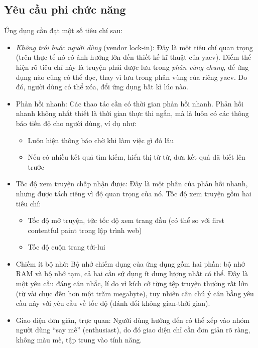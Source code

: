 \documentclass[../../thesis]{subfiles}
\begin{document}
\subsection{Yêu cầu phi chức năng}\label{sec:non-functional-requirements}

Ứng dụng cần đạt một số tiêu chí sau:

\begin{itemize}
    \item \emph{Không trói buộc người dùng} (vendor lock-in): Đây là một tiêu
        chí quan trọng (trên thực tế nó có ảnh hưởng lớn đến thiết kế kĩ thuật
        của yacv). Điểm thể hiện rõ tiêu chí này là truyện phải được lưu trong
        \emph{phân vùng chung}, để ứng dụng nào cũng có thể đọc, thay vì lưu
        trong phân vùng của riêng yacv. Do đó, người dùng có thể xóa, đổi ứng
        dụng bất kì lúc nào.
    \item
        Phản hồi nhanh: Các thao tác cần có thời gian phản hồi nhanh. Phản hồi
        nhanh không nhất thiết là thời gian thực thi ngắn, mà là luôn có các
        thông báo tiến độ cho người dùng, ví dụ như:

        \begin{itemize}
            \item
                Luôn hiện thông báo chờ khi làm việc gì đó lâu
            \item
                Nếu có nhiều kết quả tìm kiếm, hiển thị từ từ, đưa kết quả đã
                biết lên trước
        \end{itemize}
    \item
        Tốc độ xem truyện chấp nhận được: Đây là một phần của phản hồi nhanh,
        nhưng được tách riêng vì độ quan trọng của nó. Tốc độ xem truyện gồm hai
        tiêu chí:

        \begin{itemize}
            \item
                Tốc độ mở truyện, tức tốc độ xem trang đầu (có thể so với first
                contentful paint trong lập trình web)
            \item
                Tốc độ cuộn trang tới-lui
        \end{itemize}
    \item
        Chiếm ít bộ nhớ: Bộ nhớ chiếm dụng của ứng dụng gồm hai phần: bộ nhớ RAM
        và bộ nhớ tạm, cả hai cần sử dụng ít dung lượng nhất có thể. Đây là một
        yêu cầu đáng cân nhắc, lí do vì kích cỡ từng tệp truyện thường rất lớn
        (từ vài chục đến hơn một trăm megabyte), tuy nhiên cần chú ý cân bằng
        yêu cầu này với yêu cầu về tốc độ (đánh đổi không gian-thời gian).
    \item
        Giao diện đơn giản, trực quan: Người dùng hướng đến có thể xếp vào nhóm
        người dùng ``say mê'' (enthusiast), do đó giao diện chỉ cần đơn giản rõ
        ràng, không màu mè, tập trung vào tính năng.
\end{itemize}
\end{document}
